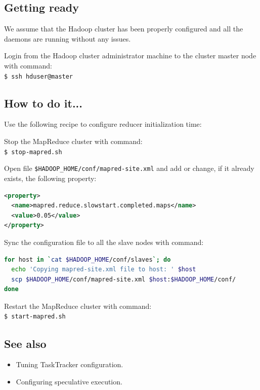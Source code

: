 \subsection*{Getting ready}
We assume that the Hadoop cluster has been properly configured and all the daemons are running without any issues.

Login from the Hadoop cluster administrator machine to the cluster master node with command: \\
\verb|$ ssh hduser@master|

\subsection*{How to do it...}
Use the following recipe to configure reducer initialization time:

Stop the MapReduce cluster with command: \\
\verb|$ stop-mapred.sh|

Open file \verb|$HADOOP_HOME/conf/mapred-site.xml| and add or change, if it already exists, the following property:
\lstset{style=bashstyle}
\begin{lstlisting}[language=XML]
<property>
  <name>mapred.reduce.slowstart.completed.maps</name>
  <value>0.05</value>
</property>
\end{lstlisting}

Sync the configuration file to all the slave nodes with command:
\lstset{style=bashstyle}
\begin{lstlisting}[language=bash]
for host in `cat $HADOOP_HOME/conf/slaves`; do
  echo 'Copying mapred-site.xml file to host: ' $host
  scp $HADOOP_HOME/conf/mapred-site.xml $host:$HADOOP_HOME/conf/
done
\end{lstlisting}

Restart the MapReduce cluster with command: \\
\verb|$ start-mapred.sh|

\subsection*{See also}
\begin{itemize}
  \item Tuning TaskTracker configuration.
  \item Configuring speculative execution.
\end{itemize}
